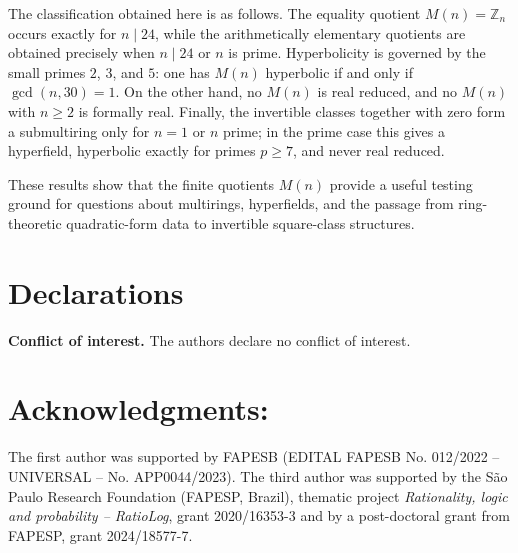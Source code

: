 \documentclass[a4paper,10pt]{article}
\begin{document}
The classification obtained here is as follows.  The equality quotient $M(n)=\mathbb Z_n$ occurs exactly for $n\mid24$, while the arithmetically elementary quotients are obtained precisely when $n\mid24$ or $n$ is prime.  Hyperbolicity is governed by the small primes $2$, $3$, and $5$: one has $M(n)$ hyperbolic if and only if $\gcd(n,30)=1$.  On the other hand, no $M(n)$ is real reduced, and no $M(n)$ with $n\ge2$ is formally real.  Finally, the invertible classes together with zero form a submultiring only for $n=1$ or $n$ prime; in the prime case this gives a hyperfield, hyperbolic exactly for primes $p\ge7$, and never real reduced.

These results show that the finite quotients $M(n)$ provide a useful testing ground for questions about multirings, hyperfields, and the passage from ring-theoretic quadratic-form data to invertible square-class structures.

\section*{Declarations}
\textbf{Conflict of interest.} The authors declare no conflict of interest.

\section*{Acknowledgments:}
The first author was supported by FAPESB (EDITAL FAPESB No. 012/2022 -- UNIVERSAL -- No. APP0044/2023). The third author was supported by the S\~ao Paulo Research Foundation (FAPESP, Brazil), thematic project {\em Rationality, logic and probability -- RatioLog}, grant  2020/16353-3 and by a post-doctoral grant from FAPESP, grant 2024/18577-7.
\end{document}
